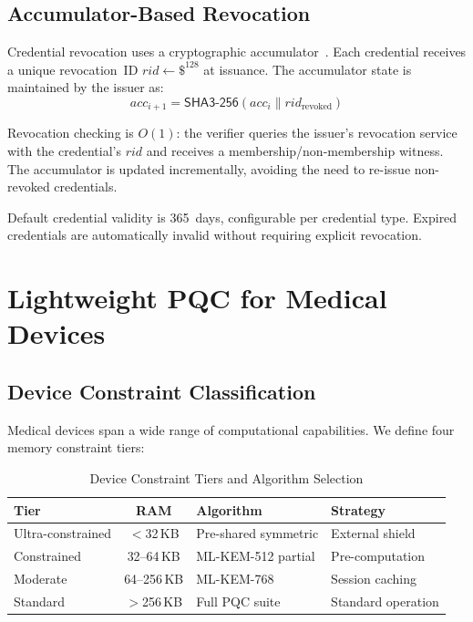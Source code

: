 \documentclass[conference,10pt]{IEEEtran}
\newcommand{\mlkem}{\textsf{ML-KEM}}
\newcommand{\shaiii}{\textsf{SHA3-256}}
\begin{document}
\subsection{Accumulator-Based Revocation}

Credential revocation uses a cryptographic accumulator~\cite{camenisch2009acc}. Each credential receives a unique revocation~ID $\mathit{rid} \leftarrow \$^{128}$ at issuance. The accumulator state is maintained by the issuer as:
\begin{equation}
\mathit{acc}_{i+1} = \shaiii{}(\mathit{acc}_i \| \mathit{rid}_{\text{revoked}})
\end{equation}

Revocation checking is $O(1)$: the verifier queries the issuer's revocation service with the credential's $\mathit{rid}$ and receives a membership/non-membership witness. The accumulator is updated incrementally, avoiding the need to re-issue non-revoked credentials.

Default credential validity is 365~days, configurable per credential type. Expired credentials are automatically invalid without requiring explicit revocation.

\section{Lightweight PQC for Medical Devices}
\label{sec:lightweight}

\subsection{Device Constraint Classification}

Medical devices span a wide range of computational capabilities. We define four memory constraint tiers:

\begin{table}[htbp]
\centering
\caption{Device Constraint Tiers and Algorithm Selection}
\label{tab:tiers}
\begin{tabular}{@{}lcll@{}}
\toprule
\textbf{Tier} & \textbf{RAM} & \textbf{Algorithm} & \textbf{Strategy} \\
\midrule
Ultra-constrained & $<$32\,KB & Pre-shared symmetric & External shield \\
Constrained & 32--64\,KB & \mlkem{}-512 partial & Pre-computation \\
Moderate & 64--256\,KB & \mlkem{}-768 & Session caching \\
Standard & $>$256\,KB & Full PQC suite & Standard operation \\
\bottomrule
\end{tabular}
\end{table}
\end{document}
